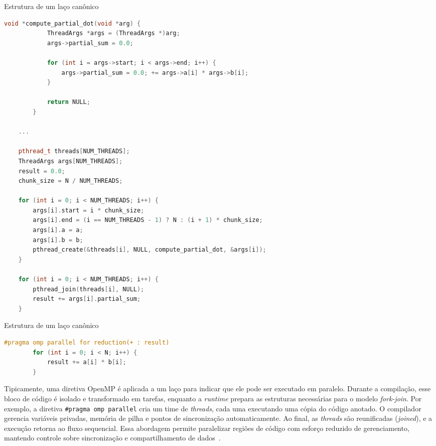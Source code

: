 \begin{sourcecode}[htb]\caption{\label{code:produtoThread}Estrutura de um laço canônico}
    \begin{lstlisting}[frame=single, language=C++]
        void *compute_partial_dot(void *arg) {
            ThreadArgs *args = (ThreadArgs *)arg;
            args->partial_sum = 0.0;
            
            for (int i = args->start; i < args->end; i++) {
                args->partial_sum = 0.0; += args->a[i] * args->b[i];
            }

            return NULL;
        }

    ...

    pthread_t threads[NUM_THREADS];
    ThreadArgs args[NUM_THREADS];
    result = 0.0;
    chunk_size = N / NUM_THREADS;

    for (int i = 0; i < NUM_THREADS; i++) {
        args[i].start = i * chunk_size;
        args[i].end = (i == NUM_THREADS - 1) ? N : (i + 1) * chunk_size;
        args[i].a = a;
        args[i].b = b;
        pthread_create(&threads[i], NULL, compute_partial_dot, &args[i]);
    }

    for (int i = 0; i < NUM_THREADS; i++) {
        pthread_join(threads[i], NULL);
        result += args[i].partial_sum;    
    }
    \end{lstlisting}
    \fonte{}
\end{sourcecode}

\begin{sourcecode}[htb]\caption{\label{code:loopCanon}Estrutura de um laço canônico}
    \begin{lstlisting}[frame=single, language=C++]
        #pragma omp parallel for reduction(+ : result)
        for (int i = 0; i < N; i++) {
            result += a[i] * b[i];
        }
    \end{lstlisting}
    \fonte{}
\end{sourcecode}

Tipicamente, uma diretiva OpenMP é aplicada a um laço para indicar que ele pode ser executado em paralelo. Durante a compilação, esse bloco de código é isolado e transformado em tarefas, enquanto a \textit{runtime} prepara as estruturas necessárias para o modelo \textit{fork-join}. Por exemplo, a diretiva \texttt{\#pragma omp parallel} cria um time de \textit{threads}, cada uma executando uma cópia do código anotado. O compilador gerencia variáveis privadas, memória de pilha e pontos de sincronização automaticamente. Ao final, as \textit{threads} são reunificadas (\textit{joined}), e a execução retorna ao fluxo sequencial. Essa abordagem permite paralelizar regiões de código com esforço reduzido de gerenciamento, mantendo controle sobre sincronização e compartilhamento de dados~\cite{mattson2019}.

